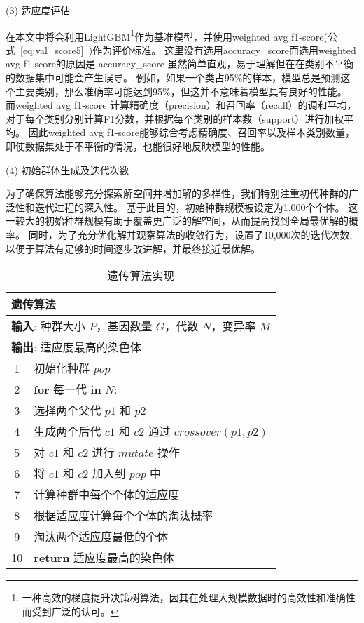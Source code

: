 (3) 适应度评估\par
在本文中将会利用LightGBM\footnote{一种高效的梯度提升决策树算法，因其在处理大规模数据时的高效性和准确性而受到广泛的认可。}作为基准模型，并使用weighted avg f1-score(公式~\ref{eq:val_score5}~)作为评价标准。
这里没有选用accuracy\_score而选用weighted avg f1-score的原因是
accuracy\_score 虽然简单直观，易于理解但在在类别不平衡的数据集中可能会产生误导。
例如，如果一个类占95\%的样本，模型总是预测这个主要类别，那么准确率可能达到95\%，但这并不意味着模型具有良好的性能。
而weighted avg f1-score 计算精确度（precision）和召回率（recall）的调和平均，对于每个类别分别计算F1分数，并根据每个类别的样本数（support）进行加权平均。
因此weighted avg f1-score能够综合考虑精确度、召回率以及样本类别数量，即使数据集处于不平衡的情况，也能很好地反映模型的性能。\par

(4) 初始群体生成及迭代次数\par
为了确保算法能够充分探索解空间并增加解的多样性，我们特别注重初代种群的广泛性和迭代过程的深入性。
基于此目的，初始种群规模被设定为1,000个个体。
这一较大的初始种群规模有助于覆盖更广泛的解空间，从而提高找到全局最优解的概率。
同时，为了充分优化解并观察算法的收敛行为，设置了10,000次的迭代次数,以便于算法有足够的时间逐步改进解，并最终接近最优解。\par

\begin{table}[htbp]
  \caption{遗传算法实现}
  \label{tab:genetic_algorithm}
  \centering
  \begin{tabularx}{1.0\textwidth}{cl}
  \toprule
  \multicolumn{2}{l}{\textbf{遗传算法}}\\
  \midrule
  \multicolumn{2}{l}{\textbf{输入}: 种群大小 $P$，基因数量 $G$，代数 $N$，变异率 $M$} \\
  \multicolumn{2}{l}{\textbf{输出}: 适应度最高的染色体} \\
  1& 初始化种群 $pop$ \\
  2& \textbf{for} 每一代 \textbf{in} $N$: \\
  3&\quad 选择两个父代 $p1$ 和 $p2$ \\
  4&\quad 生成两个后代 $c1$ 和 $c2$ 通过 $crossover(p1, p2)$ \\
  5&\quad 对 $c1$ 和 $c2$ 进行 $mutate$ 操作 \\
  6&\quad 将 $c1$ 和 $c2$ 加入到 $pop$ 中 \\
  7&\quad 计算种群中每个个体的适应度 \\
  8&\quad 根据适应度计算每个个体的淘汰概率 \\
  9&\quad 淘汰两个适应度最低的个体 \\
  10& \textbf{return} 适应度最高的染色体 \\
  \bottomrule
  \end{tabularx}
\end{table}

